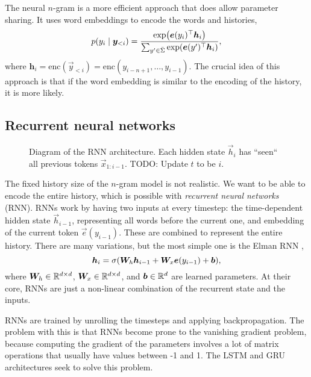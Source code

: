 The neural $n$-gram \citep{bengio2000neural} is a more efficient approach that does allow parameter
sharing. It uses word embeddings to encode the words and
histories, \[
  p(y_i\mid \bm{y}_{<i}) = \frac{\exp \lft( \transpose{\vec{e}(y_i)} \vec{h}_i \rgt)}{\sum_{y'\in\bar{\Sigma}} \exp \lft( \transpose{\vec{e}(y')} \vec{h}_i \rgt)}
,\]
where $\bm{h}_i = \mathrm{enc}(\vec{y}_{<i}) =
\text{enc}(y_{i-n+1},\ldots,y_{i-1})$. The crucial idea of this approach is that if the word embedding
is similar to the encoding of the history, it is more likely.

\subsection{Recurrent neural networks}

\begin{figure}[ht]
    \centering
    \caption{Diagram of the RNN architecture. Each hidden state $\vec{h}_i$ has
    ``seen`` all previous tokens $\vec{x}_{1:{i-1}}$. TODO: Update $t$ to be $i$.}
    \label{fig:rnn}
\end{figure}

The fixed history size of the $n$-gram model is not realistic. We want to be
able to encode the entire history, which is possible with \textit{recurrent
neural networks} (RNN). RNNs work by having two inputs at every timestep: the
time-dependent hidden state $\vec{h}_{i-1}$, representing all words before the
current one, and embedding of the current token $\vec{e}(y_{i-1})$. These are
combined to represent the entire history. There are many variations, but the
most simple one is the Elman RNN \citep{elman1990finding}, \[
  \vec{h}_i = \sigma \lft( \mat{W}_h \vec{h}_{i-1} + \mat{W}_x \vec{e}(y_{i-1}) + \vec{b} \rgt)
,\] 
where $\bm{W}_h \in \mathbb{R}^{d\times d}$, $\bm{W}_x \in \mathbb{R}^{d\times d}$, and
$\bm{b} \in \mathbb{R}^d$ are learned parameters. At their core, RNNs are just a
non-linear combination of the recurrent state and the inputs.

RNNs are trained by unrolling the timesteps and applying backpropagation. The
problem with this is that RNNs become prone to the vanishing gradient problem,
because computing the gradient of the parameters involves a lot of matrix
operations that usually have values between -1 and 1. The LSTM
\citep{hochreiter1997long} and GRU \citep{cho2014learning} architectures seek
to solve this problem.

